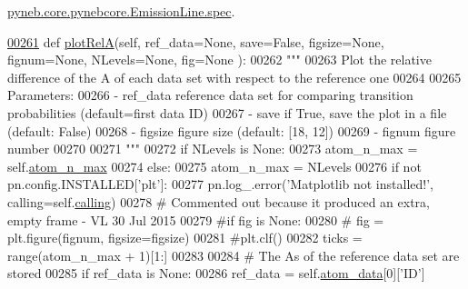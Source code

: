 \hyperlink{pynebcore_8py_source_l03268}{pyneb.\+core.\+pynebcore.\+Emission\+Line.\+spec}.


\begin{DoxyCode}
\hypertarget{classpyneb_1_1plot_1_1plot_atomic_data_1_1_data_plot_l00261}{}\hyperlink{classpyneb_1_1plot_1_1plot_atomic_data_1_1_data_plot_a9fc5e1df4de9471e26b20018ce89eb9d}{00261}     \textcolor{keyword}{def }\hyperlink{classpyneb_1_1plot_1_1plot_atomic_data_1_1_data_plot_a9fc5e1df4de9471e26b20018ce89eb9d}{plotRelA}(self, ref\_data=None, save=False, figsize=None, fignum=None, NLevels=None, fig=None
      ):
00262         \textcolor{stringliteral}{"""}
00263 \textcolor{stringliteral}{        Plot the relative difference of the A of each data set with respect to the reference one}
00264 \textcolor{stringliteral}{}
00265 \textcolor{stringliteral}{        Parameters:}
00266 \textcolor{stringliteral}{            - ref\_data       reference data set for comparing transition probabilities (default=first data
       ID)}
00267 \textcolor{stringliteral}{            - save           if True, save the plot in a file (default: False)}
00268 \textcolor{stringliteral}{            - figsize        figure size (default: [18, 12])}
00269 \textcolor{stringliteral}{            - fignum         figure number}
00270 \textcolor{stringliteral}{}
00271 \textcolor{stringliteral}{        """}
00272         \textcolor{keywordflow}{if} NLevels \textcolor{keywordflow}{is} \textcolor{keywordtype}{None}:
00273             atom\_n\_max = self.\hyperlink{classpyneb_1_1plot_1_1plot_atomic_data_1_1_data_plot_a668572cfe9a684e7195535d60d343938}{atom\_n\_max}
00274         \textcolor{keywordflow}{else}:
00275             atom\_n\_max = NLevels
00276         \textcolor{keywordflow}{if} \textcolor{keywordflow}{not} pn.config.INSTALLED[\textcolor{stringliteral}{'plt'}]:
00277             pn.log\_.error(\textcolor{stringliteral}{'Matplotlib not installed!'}, calling=self.\hyperlink{classpyneb_1_1plot_1_1plot_atomic_data_1_1_data_plot_a393a133b607541c57d5ebc5a34687e3f}{calling})
00278         \textcolor{comment}{# Commented out because it produced an extra, empty frame - VL 30 Jul 2015}
00279         \textcolor{comment}{#if fig is None:}
00280         \textcolor{comment}{#    fig = plt.figure(fignum, figsize=figsize)}
00281         \textcolor{comment}{#plt.clf()}
00282         ticks = range(atom\_n\_max + 1)[1:]
00283 
00284         \textcolor{comment}{# The As of the reference data set are stored}
00285         \textcolor{keywordflow}{if} ref\_data \textcolor{keywordflow}{is} \textcolor{keywordtype}{None}:
00286             ref\_data = self.\hyperlink{classpyneb_1_1plot_1_1plot_atomic_data_1_1_data_plot_aee33ad460a38cb4293a5bd89cec12294}{atom\_data}[0][\textcolor{stringliteral}{'ID'}]

\end{DoxyCode}
